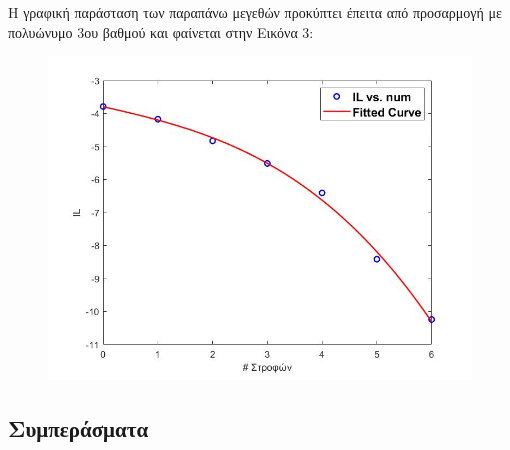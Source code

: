 \documentclass[a4paper]{article}
\begin{document}
	Η γραφική παράσταση των παραπάνω μεγεθών προκύπτει έπειτα από προσαρμογή με πολυώνυμο 3ου βαθμού και φαίνεται στην Εικόνα 3: 
	
	\begin{figure}[h!]
		\centering
		\includegraphics[scale=0.5]{last.jpg}
		\caption{ }
	\end{figure}
\subsection*{Συμπεράσματα}
\end{document}
